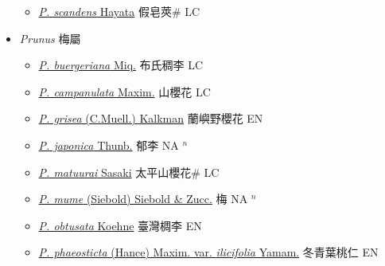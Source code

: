 \begin{itemize}
  \begin{itemize}
        \item[] \href{http://www.theplantlist.org/tpl1.1/search?q=Prinsepia+scandens}{\textit{P. scandens} Hayata}   假皂莢\# LC
  \end{itemize}
 \item[] \textit{Prunus} 梅屬
                    
  \begin{itemize}
        \item[] \href{http://www.theplantlist.org/tpl1.1/search?q=Prunus+buergeriana}{\textit{P. buergeriana} Miq.}   布氏稠李 LC
        \item[] \href{http://www.theplantlist.org/tpl1.1/search?q=Prunus+campanulata}{\textit{P. campanulata} Maxim.}   山櫻花 LC
        \item[] \href{http://www.theplantlist.org/tpl1.1/search?q=Prunus+grisea}{\textit{P. grisea} (C.Muell.) Kalkman}   蘭嶼野櫻花 EN
        \item[] \href{http://www.theplantlist.org/tpl1.1/search?q=Prunus+japonica}{\textit{P. japonica} Thunb.}   郁李 NA $^n$
        \item[] \href{http://www.theplantlist.org/tpl1.1/search?q=Prunus+matuurai}{\textit{P. matuurai} Sasaki}   太平山櫻花\# LC
        \item[] \href{http://www.theplantlist.org/tpl1.1/search?q=Prunus+mume}{\textit{P. mume} (Siebold) Siebold \& Zucc.}   梅 NA $^n$
        \item[] \href{http://www.theplantlist.org/tpl1.1/search?q=Prunus+obtusata}{\textit{P. obtusata} Koehne}   臺灣椆李 EN
        \item[] \href{http://www.theplantlist.org/tpl1.1/search?q=Prunus+phaeosticta+var.+ilicifolia}{\textit{P. phaeosticta} (Hance) Maxim. var. \textit{ilicifolia} Yamam.}   冬青葉桃仁 EN

\end{itemize}
\end{itemize}
